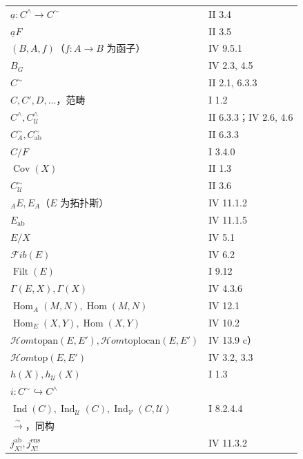 \begin{longtable}{@{}p{}p{}@{}}
$\underline a:C^\wedge\to C^{\sim}$ & II 3.4\\
$\underline aF$ & II 3.5\\
$(B,A,f)$（$f:A\to B$ 为函子） & IV 9.5.1\\
$B_G$ & IV 2.3, 4.5\\
$C^{\sim}$ & II 2.1, 6.3.3\\
$C,C',D,\ldots$，范畴 & I 1.2\\
$C^\wedge,C^\wedge_{\mathcal U}$ & II 6.3.3；IV 2.6, 4.6\\
$C^{\sim}_A,C^{\sim}_{\mathrm{ab}}$ & II 6.3.3\\
$C/F$ & I 3.4.0\\
$\operatorname{Cov}(X)$ & II 1.3\\
$C^{\sim}_{\mathcal U}$ & II 3.6\\
${}_AE,E_A$（$E$ 为拓扑斯） & IV 11.1.2\\
$E_{\mathrm{ab}}$ & IV 11.1.5\\
$E/X$ & IV 5.1\\
$\mathscr{F}\!ib(E)$ & IV 6.2\\
$\operatorname{Filt}(E)$ & I 9.12\\
$\Gamma(E,X),\Gamma(X)$ & IV 4.3.6\\
$\operatorname{Hom}_A(M,N),\operatorname{Hom}(M,N)$ & IV 12.1\\
$\operatorname{Hom}_E(X,Y),\operatorname{Hom}(X,Y)$ & IV 10.2\\
$\mathscr{H}\!om\mathrm{topan}(E,E'),\mathscr{H}\!om\mathrm{toplocan}(E,E')$ & IV 13.9 c）\\
$\mathscr{H}\!om\mathrm{top}(E,E')$ & IV 3.2, 3.3\\
$h(X),h_{\mathcal U}(X)$ & I 1.3\\
$i:C^{\sim}\hookrightarrow C^\wedge$ & \\
$\operatorname{Ind}(C),\operatorname{Ind}_{\mathcal U}(C),\operatorname{Ind}_{\mathcal V}(C,\mathcal U)$ & I 8.2.4.4\\
$\xrightarrow{\sim}$，同构 & \\
$j_{X!}^{\mathrm{ab}},j_{X!}^{\mathrm{ens}}$ & IV 11.3.2\\
\end{longtable}
